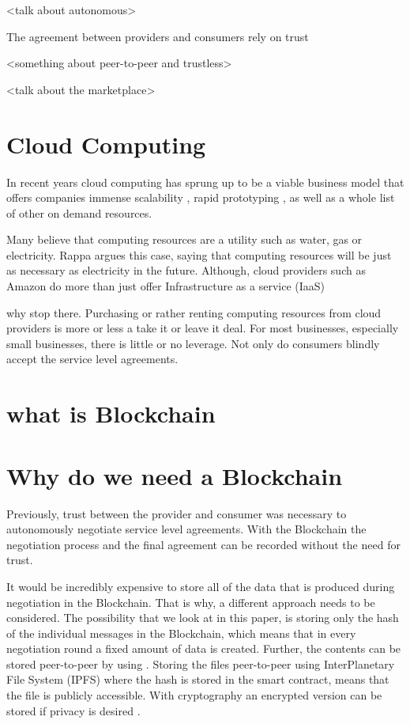<talk about autonomous>

The agreement between providers and consumers rely on trust

<something about peer-to-peer and trustless>


<talk about the marketplace>

\section{Cloud Computing}

In recent years cloud computing has sprung up to be a viable business model that offers companies immense scalability \cite{bookOnCloud}, rapid prototyping \cite{prototyping}, as well as a whole list of other on demand resources. 

Many believe that computing resources are a utility such as water, gas or electricity. Rappa \cite{utilitycomputing} argues this case, saying that computing resources will be just as necessary as electricity in the future. Although, cloud providers such as Amazon do more than just offer Infrastructure as a service (IaaS)  

why stop there. Purchasing or rather renting computing resources from cloud providers is more or less a take it or leave it deal. For most businesses, especially small businesses, there is little or no leverage. Not only do consumers blindly accept the service level agreements.

\section{what is Blockchain}

\section{Why do we need a Blockchain}

Previously, trust between the provider and consumer was necessary to autonomously negotiate service level agreements. With the Blockchain the negotiation process and the final agreement can be recorded without the need for trust.

It would be incredibly expensive to store all of the data that is produced during negotiation in the Blockchain. That is why, a different approach needs to be considered. The possibility that we look at in this paper, is storing only the hash of the individual messages in the Blockchain, which means that in every negotiation round a fixed amount of data is created. Further, the contents can be stored peer-to-peer by using \cite{ipfs}. Storing the files peer-to-peer using InterPlanetary File System (IPFS) where the hash is stored in the smart contract, means that the file is publicly accessible. With cryptography an encrypted version can be stored if privacy is desired \cite{kamara2010cryptographic}. 
